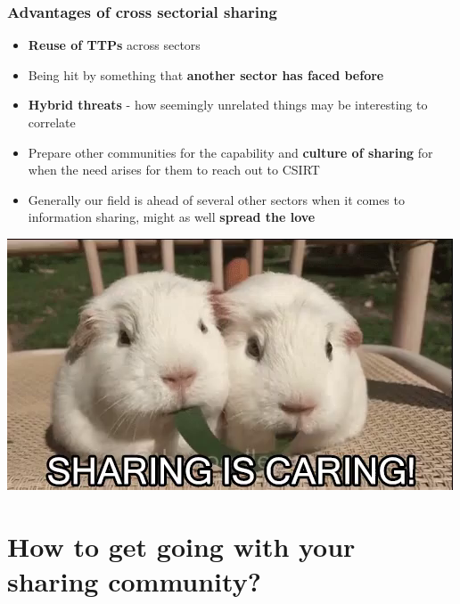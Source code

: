 \begin{frame}
	\frametitle{Advantages of cross sectorial sharing}
	\begin{itemize}
		\item {\bf Reuse of TTPs} across sectors
		\item Being hit by something that {\bf another sector has faced before}
		\item {\bf Hybrid threats} - how seemingly unrelated things may be interesting to correlate
		\item Prepare other communities for the capability and {\bf culture of sharing} for when the need arises for them to reach out to CSIRT
		\item Generally our field is ahead of several other sectors when it comes to information sharing, might as well {\bf spread the love}
	\end{itemize}
	\centering\includegraphics[scale=0.3]{../images/sharing.jpeg}
\end{frame}

\section{How to get going with your\\ sharing community?}

